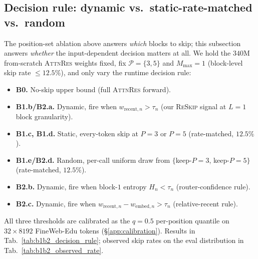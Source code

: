 \documentclass{article}
\newcommand{\attnres}{\textsc{AttnRes}}
\newcommand{\reskip}{\textsc{ReSkip}}
\begin{document}
\subsection{Decision rule: dynamic vs.\ static-rate-matched vs.\ random}
\label{app:b1b2_decision_rule}
The position-set ablation above answers \emph{which} blocks to skip; this
subsection answers \emph{whether} the input-dependent decision matters at
all. We hold the $340$M from-scratch \attnres{} weights fixed, fix
$\mathcal{P}{=}\{3,5\}$ and $M_{\max}{=}1$ (block-level skip rate
$\le 12.5\%$), and only vary the runtime decision rule:
\begin{itemize}\setlength{\itemsep}{0pt}
  \item \textbf{B0.} No-skip upper bound (full \attnres{} forward).
  \item \textbf{B1.b/B2.a.} Dynamic, fire when $w_{\text{recent},n} > \tau_n$ (our \reskip{} signal at $L{=}1$ block granularity).
  \item \textbf{B1.c, B1.d.} Static, every-token skip at $P{=}3$ or $P{=}5$ (rate-matched, $12.5\%$).
  \item \textbf{B1.e/B2.d.} Random, per-call uniform draw from $\{$keep-$P{=}3$, keep-$P{=}5\}$ (rate-matched, $12.5\%$).
  \item \textbf{B2.b.} Dynamic, fire when block-$1$ entropy $H_n < \tau_n$ (router-confidence rule).
  \item \textbf{B2.c.} Dynamic, fire when $w_{\text{recent},n} - w_{\text{embed},n} > \tau_n$ (relative-recent rule).
\end{itemize}
All three thresholds are calibrated as the $q{=}0.5$ per-position quantile
on $32{\times}8192$ FineWeb-Edu tokens (\S\ref{app:calibration}). Results
in Tab.~\ref{tab:b1b2_decision_rule}; observed skip rates on the eval
distribution in Tab.~\ref{tab:b1b2_observed_rate}.
\end{document}
